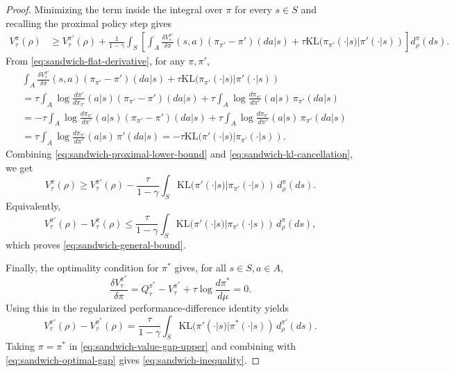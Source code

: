 \documentclass{amsart}
\theoremstyle{definition}
\begin{document}
\begin{proof}
Minimizing the term inside the integral over $\pi$ for every $s\in S$ and
recalling the proximal policy step gives
\begin{align}
V_\tau^\pi(\rho)
&\ge
V_\tau^{\pi'}(\rho)
+
\frac{1}{1-\gamma}
\int_S
\left[
\int_A
\frac{\delta V_\tau^{\pi'}}{\delta \pi}(s,a)
(\pi_{\pi'}-\pi')(da| s)
+
\tau \mathrm{KL}(\pi_{\pi'}(\cdot | s)| \pi'(\cdot | s))
\right]
d_\rho^\pi(ds).
\label{eq:sandwich-proximal-lower-bound}
\end{align}
From \eqref{eq:sandwich-flat-derivative}, for any $\pi,\pi'$,
\begin{align}
&\int_A
\frac{\delta V_\tau^{\pi'}}{\delta \pi}(s,a)
(\pi_{\pi'}-\pi')(da| s)
+
\tau \mathrm{KL}(\pi_{\pi'}(\cdot | s)| \pi'(\cdot | s))
\nonumber \\
&=
\tau
\int_A
\log \frac{d\pi'}{d\pi_{\pi'}}(a|s)
(\pi_{\pi'}-\pi')(da| s)
+
\tau
\int_A
\log \frac{d\pi_{\pi'}}{d\pi'}(a|s)
\,\pi_{\pi'}(da| s)
\nonumber \\
&=
-\tau
\int_A
\log \frac{d\pi_{\pi'}}{d\pi'}(a|s)
(\pi_{\pi'}-\pi')(da| s)
+
\tau
\int_A
\log \frac{d\pi_{\pi'}}{d\pi'}(a|s)
\,\pi_{\pi'}(da| s)
\nonumber \\
&=
\tau
\int_A
\log \frac{d\pi_{\pi'}}{d\pi'}(a|s)
\,\pi'(da| s)
=
-\tau \mathrm{KL}(\pi'(\cdot | s)| \pi_{\pi'}(\cdot |s)).
\label{eq:sandwich-kl-cancellation}
\end{align}
Combining \eqref{eq:sandwich-proximal-lower-bound} and
\eqref{eq:sandwich-kl-cancellation}, we get
\begin{equation}
V_\tau^\pi(\rho)
\ge
V_\tau^{\pi'}(\rho)
-
\frac{\tau}{1-\gamma}
\int_S
\mathrm{KL}(\pi'(\cdot | s)| \pi_{\pi'}(\cdot |s))
\,d_\rho^\pi(ds).
\label{eq:sandwich-lower-bound}
\end{equation}
Equivalently,
\begin{equation}
V_\tau^{\pi'}(\rho)-V_\tau^\pi(\rho)
\le
\frac{\tau}{1-\gamma}
\int_S
\mathrm{KL}(\pi'(\cdot | s)| \pi_{\pi'}(\cdot |s))
\,d_\rho^\pi(ds),
\label{eq:sandwich-value-gap-upper}
\end{equation}
which proves \eqref{eq:sandwich-general-bound}.

Finally, the optimality condition for $\pi^*$ gives, for all $s \in S,a \in A$,
\begin{equation}
\frac{\delta V_\tau^{\pi^*}}{\delta \pi}
=
Q_\tau^{\pi^*}
-
V_\tau^{\pi^*}
+
\tau \log \frac{d\pi^*}{d\mu}
=
0.
\label{eq:sandwich-optimality-condition}
\end{equation}
Using this in the regularized performance-difference identity yields
\begin{equation}
V_\tau^{\pi'}(\rho)-V_\tau^{\pi^*}(\rho)
=
\frac{\tau}{1-\gamma}
\int_S
\mathrm{KL}(\pi'(\cdot |s)| \pi^*(\cdot | s))
\,d_\rho^{\pi'}(ds).
\label{eq:sandwich-optimal-gap}
\end{equation}
Taking $\pi=\pi^*$ in \eqref{eq:sandwich-value-gap-upper} and combining with
\eqref{eq:sandwich-optimal-gap} gives
\eqref{eq:sandwich-inequality}.
\end{proof}
\end{document}
